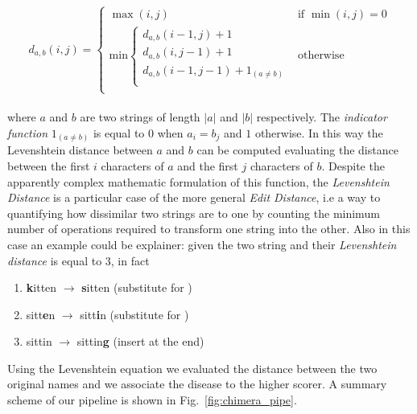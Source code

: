 \documentclass{standalone}
\begin{document}
$$
d_{a, b}(i, j) = \left\{ \begin{array}{rc}
  \max(i, j)                                                       & \mbox{if   } \min(i, j) = 0 \\
  \mbox{min} \left\{ \begin{array}{r}
      d_{a, b}(i - 1, j) + 1                     \\
      d_{a, b}(i, j - 1) + 1                     \\
      d_{a, b}(i - 1, j - 1) + 1_{(a \neq b)}    \\
    \end{array}
    \right.                                                        & \mbox{otherwise}            \\

  \end{array}
  \right.
$$
\\
where $a$ and $b$ are two strings of length $|a|$ and $|b|$ respectively.
The \emph{indicator function} $1_{(a \neq b)}$ is equal to $0$ when $a_i = b_j$ and $1$ otherwise.
In this way the Levenshtein distance between $a$ and $b$ can be computed evaluating the distance between the first $i$ characters of $a$ and the first $j$ characters of $b$.
Despite the apparently complex mathematic formulation of this function, the \emph{Levenshtein Distance} is a particular case of the more general \emph{Edit Distance}, i.e a way to quantifying how dissimilar two strings are to one by counting the minimum number of operations required to transform one string into the other.
Also in this case an example could be explainer: given the two string  and  their \emph{Levenshtein distance} is equal to 3, in fact

\begin{enumerate}

  \item \textbf{k}itten $\rightarrow$ \textbf{s}itten (substitute  for )
  \item sitt\textbf{e}n $\rightarrow$ sitt\textbf{i}n (substitute  for )
  \item sittin $\rightarrow$ sittin\textbf{g} (insert  at the end)

\end{enumerate}

Using the Levenshtein equation we evaluated the distance between the two original names and we associate the disease to the higher scorer.
A summary scheme of our pipeline is shown in Fig.~\ref{fig:chimera_pipe}.
\end{document}

